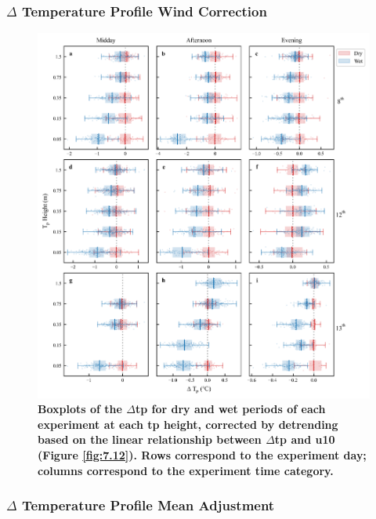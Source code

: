 \documentclass[final,3p,times,authoryear]{elsarticle}
\begin{document}
{\subsubsection{$\Delta$ Temperature Profile Wind Correction}\label{sec:appendix7.5.5}

\begin{figure}
\centering
\includegraphics[trim={0 0 0 0},clip,scale=1.0]{pict042.png}
\caption{\bf Boxplots of the $\Delta$\gls{tp} for dry and wet periods of each experiment at each \gls{tp} height, corrected
by detrending based on the linear relationship between $\Delta$\gls{tp} and \gls{u10} (Figure \ref{fig:7.12}). Rows correspond to
the experiment day; columns correspond to the experiment time category.}
 \label{fig:7.13}
\end{figure}

\subsubsection{$\Delta$ Temperature Profile Mean Adjustment}\label{sec:appendix7.5.6}

}
\end{document}
